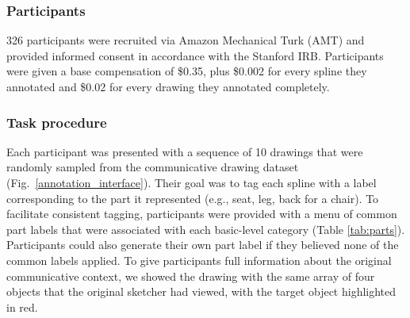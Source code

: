 \documentclass[10pt,letterpaper]{article}
\begin{document}
\subsubsection{Participants}
326 participants were recruited via Amazon Mechanical Turk (AMT) and provided informed consent in accordance with the Stanford IRB. 
Participants were given a base compensation of \$0.35, plus \$0.002 for every spline they annotated and \$0.02 for every drawing they annotated completely. 

\subsubsection{Task procedure}
Each participant was presented with a sequence of 10 drawings that were randomly sampled from the communicative drawing dataset (Fig.~\ref{annotation_interface}). 
Their goal was to tag each spline with a label corresponding to the part it represented (e.g., seat, leg, back for a chair).  
To facilitate consistent tagging, participants were provided with a menu of common part labels that were associated with each basic-level category (Table \ref{tab:parts}).
Participants could also generate their own part label if they believed none of the common labels applied.
To give participants full information about the original communicative context, we showed the drawing with the same array of four objects that the original sketcher had viewed, with the target object highlighted in red. 
\end{document}
